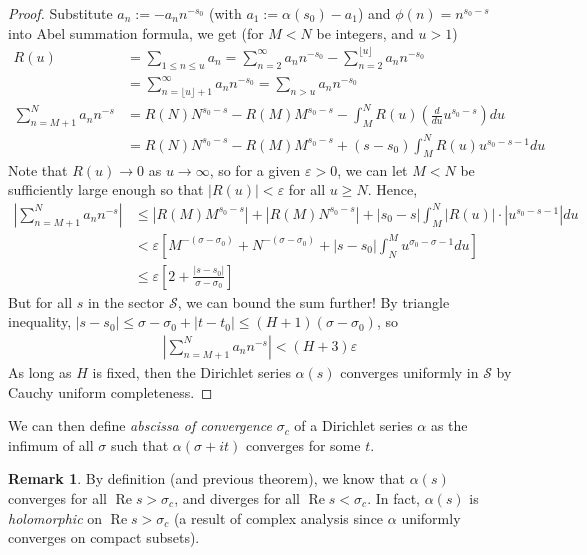 \documentclass{article}
\theoremstyle{definition}
\newtheorem{remark}[theorem]{Remark}
\begin{document}
\begin{shaded}
\begin{proof}
Substitute $a_n := -a_n n^{-s_0}$ (with $a_1 := \alpha(s_0) - a_1$) and $\phi(n) = n^{s_0 - s}$ into Abel summation formula, we get (for $M < N$ be integers, and $u > 1$)
\begin{align*}
R(u) & = \sum_{1 \leq n \leq u} a_n = \sum_{n = 2}^\infty a_n n^{-s_0} - \sum_{n = 2}^{\lfloor u \rfloor} a_n n^{-s_0}
\\
& = \sum_{n = \lfloor u \rfloor + 1}^\infty a_n n^{-s_0} = \sum_{n > u} a_n n^{-s_0}
\\
\sum_{n = M+1}^N a_n n^{-s} & = R(N) N^{s_0 - s} - R(M) M^{s_0 - s} - \int_M^N  R(u) \left( \frac{d}{du} u^{s_0 - s} \right) du
\\
& = R(N) N^{s_0 - s} - R(M) M^{s_0 - s} + (s - s_0) \int_M^N  R(u) u^{s_0 - s - 1} du
\end{align*}
Note that $R(u) \to 0$ as $u \to \infty$, so for a given $\varepsilon > 0$, we can let $M < N$ be sufficiently large enough so that $|R(u)| < \varepsilon$ for all $u \geq N$. Hence,
\begin{align*}
\left| \sum_{n = M+1}^N a_n n^{-s} \right| & \leq |R(M) M^{s_0 - s}| + |R(M) N^{s_0 - s}| + |s_0 - s| \int_M^N |R(u)| \cdot |u^{s_0 - s - 1}| du
\\
& < \varepsilon \left[ M^{- (\sigma - \sigma_0)} + N^{- (\sigma - \sigma_0)} + |s - s_0| \int_N^M u^{\sigma_0 - \sigma - 1} du \right]
\\
& \leq \varepsilon \left[ 2 + \frac{|s - s_0|}{\sigma - \sigma_0} \right]
\end{align*}
But for all $s$ in the sector $\mathcal{S}$, we can bound the sum further! By triangle inequality, $|s - s_0| \leq \sigma - \sigma_0 + |t - t_0| \leq (H + 1) (\sigma - \sigma_0)$, so
\begin{align*}
\left| \sum_{n = M+1}^N a_n n^{-s} \right| < (H + 3) \varepsilon
\end{align*}
As long as $H$ is fixed, then the Dirichlet series $\alpha(s)$ converges uniformly in $\mathcal{S}$ by Cauchy uniform completeness.
\end{proof}
We can then define \emph{abscissa of convergence} $\sigma_c$ of a Dirichlet series $\alpha$ as the infimum of all $\sigma$ such that $\alpha(\sigma + it)$ converges for some $t$.
\begin{remark}
By definition (and previous theorem), we know that $\alpha(s)$ converges for all $\operatorname{Re} s > \sigma_c$, and diverges for all $\operatorname{Re} s < \sigma_c$. In fact, $\alpha(s)$ is \textit{holomorphic} on $\operatorname{Re} s > \sigma_c$ (a result of complex analysis since $\alpha$ uniformly converges on compact subsets).
\end{remark}
\end{shaded}
\end{document}

